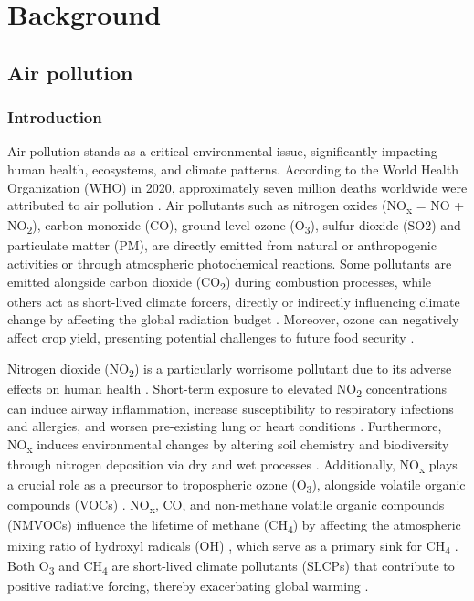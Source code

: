 \chapter{Background} \label{chap2}
\renewcommand{\headrulewidth}{0pt}
\lhead[\thepage]{\leftmark}
\rhead[\leftmark]{\thepage}
\cfoot[]{}

\section{Air pollution}
\subsection{Introduction}

Air pollution stands as a critical environmental issue, significantly impacting human health, ecosystems, and climate patterns. According to the World Health Organization (WHO) in 2020, approximately seven million deaths worldwide were attributed to air pollution \citep{who2020world}. Air pollutants such as nitrogen oxides (NO\textsubscript{x} = NO + NO\textsubscript{2}), carbon monoxide (CO), ground-level ozone (O\textsubscript{3}), sulfur dioxide (SO2) and particulate matter (PM), are directly emitted from natural or anthropogenic activities or through atmospheric photochemical reactions. Some pollutants are emitted alongside carbon dioxide (CO\textsubscript{2}) during combustion processes, while others act as short-lived climate forcers, directly or indirectly influencing climate change by affecting the global radiation budget \citep{RN3}. Moreover, ozone can negatively affect crop yield, presenting potential challenges to future food security \citep{avnery2011global, avnery2011global2, chuwah2015global, tai2017impacts}. \par
Nitrogen dioxide (NO\textsubscript{2}) is a particularly worrisome pollutant due to its adverse effects on human health \citep{hamra2015lung}. Short-term exposure to elevated NO\textsubscript{2} concentrations can induce airway inflammation, increase susceptibility to respiratory infections and allergies, and worsen pre-existing lung or heart conditions \citep{bono2016air, kelly2011air}. Furthermore, NO\textsubscript{x} induces environmental changes by altering soil chemistry and biodiversity through nitrogen deposition via dry and wet processes \citep{bobbink2010global}. Additionally, NO\textsubscript{x} plays a crucial role as a precursor to tropospheric ozone (O\textsubscript{3}), alongside volatile organic compounds (VOCs) \citep{akimoto2022rethinking}. NO\textsubscript{x}, CO, and non-methane volatile organic compounds (NMVOCs) influence the lifetime of methane (CH\textsubscript{4}) by affecting the atmospheric mixing ratio of hydroxyl radicals (OH) \citep{akimoto2022rethinking}, which serve as a primary sink for CH\textsubscript{4} \citep{turner2019interpreting}. Both O\textsubscript{3} and CH\textsubscript{4} are short-lived climate pollutants (SLCPs) that contribute to positive radiative forcing, thereby exacerbating global warming \citep{akimoto2022rethinking}. \par

